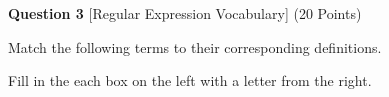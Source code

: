 \documentclass{article}
\begin{document}

\vspace{1.0cm}


\begin{minipage}{\textwidth}
    \noindent
    \textbf{Question 3} [Regular Expression Vocabulary] (20 Points)
    \vspace{0.25cm}

    \noindent
    Match the following terms to their corresponding definitions.

    \vspace{0.25cm}
    Fill in the each box on the left with a letter from the right.

    \vspace{0.50cm}


\end{minipage}
\end{document}
